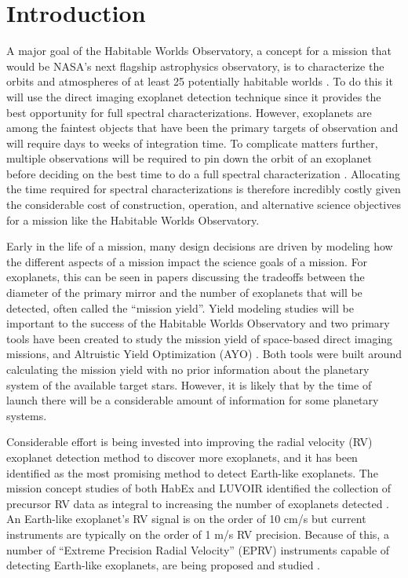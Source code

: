 \section{Introduction}

A major goal of the Habitable Worlds Observatory, a concept for a mission that
would be NASA's next flagship astrophysics observatory, is to characterize the
orbits and atmospheres of at least 25 potentially habitable worlds
\citep{bollesGreatObservatory2023}. To do this it will use the direct imaging exoplanet
detection technique since it provides the best opportunity for full spectral
characterizations. However, exoplanets are among the faintest objects that have
been the primary targets of observation and will require days to weeks of
integration time. To complicate matters further, multiple observations will be
required to pin down the orbit of an exoplanet before deciding on the best time
to do a full spectral characterization \citep{horningMinimumNumber2019}.
Allocating the time required for spectral characterizations is therefore
incredibly costly given the considerable cost of construction, operation, and
alternative science objectives for a mission like the Habitable Worlds
Observatory.

Early in the life of a mission, many design decisions are driven by modeling
how the different aspects of a mission impact the science goals of a mission.
For exoplanets, this can be seen in papers discussing the tradeoffs between the
diameter of the primary mirror and the number of exoplanets that will be
detected, often called the ``mission yield''. Yield modeling studies will be
important to the success of the Habitable Worlds Observatory and two primary
tools have been created to study the mission yield of space-based direct
imaging missions, 
\citep{savranskyEXOSIMSExoplanetOpenSource2017} and Altruistic Yield
Optimization (AYO) \citep{starkMaximizingExoEarthCandidate2014}. Both tools
were built around calculating the mission yield with no prior information about
the planetary system of the available target stars. However, it is likely that
by the time of launch there will be a considerable amount of information for
some planetary systems.

Considerable effort is being invested into improving the radial velocity (RV)
exoplanet detection method to discover more exoplanets, and it has been
identified as the most promising method to detect Earth-like exoplanets. The
mission concept studies of both HabEx and LUVOIR identified the collection of
precursor RV data as integral to increasing the number of exoplanets detected
\citep{gaudiHabitableExoplanetObservatory2020, TheLUVOIRTeam2019}. An
Earth-like exoplanet's RV signal is on the order of 10 cm/s but current
instruments are typically on the order of 1 m/s RV precision. Because of
this, a number of ``Extreme Precision Radial Velocity'' (EPRV) instruments capable of detecting Earth-like exoplanets, are being proposed and
studied \citep{Crass2021}.

